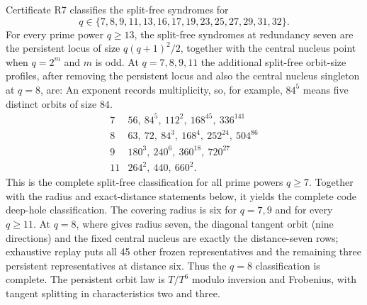 \pagebreak[3]
\begin{theorem}
\label{thm:r7}%
%
%
%
%
%
%
Certificate R7 classifies the split-free syndromes for
\[
q\in\{7,8,9,11,13,16,17,19,23,25,27,29,31,32\}.
\]
For every prime power $q\geq13$,
the split-free syndromes
at redundancy seven are the persistent locus of size
\(q(q+1)^2/2\), together with the
central nucleus point when $q=2^m$ and $m$ is odd.  At $q=7,8,9,11$ the additional
split-free orbit-size profiles, after removing the persistent locus
and also the central nucleus singleton at \(q=8\), are:
An exponent records multiplicity, so, for example, \(84^5\) means five
distinct orbits of size \(84\).
\[
\begin{array}{c|l}
7&56,\ 84^5,\ 112^2,\ 168^{45},\ 336^{141}\\
8&63,\ 72,\ 84^3,\ 168^4,\ 252^{24},\ 504^{86}\\
9&180^3,\ 240^6,\ 360^{18},\ 720^{27}\\
11&264^2,\ 440,\ 660^2 .
\end{array}
\]
This is the complete split-free classification for all prime powers
\(q\geq7\).  Together with the radius and exact-distance statements below,
it yields the complete code deep-hole classification.
The covering radius is six for \(q=7,9\) and for every \(q\geq11\).
At $q=8$, where
\cite[Thm.~17(1)]{WuDingChen2023} gives radius seven, the diagonal tangent
orbit (nine directions) and the fixed central nucleus are exactly the
distance-seven rows; exhaustive replay puts all 45 other frozen representatives
and the remaining three persistent representatives at distance six. Thus the
$q=8$ classification is complete. The
persistent orbit law is $T/T^6$ modulo inversion and Frobenius, with
tangent splitting in characteristics two and three.
\end{theorem}

